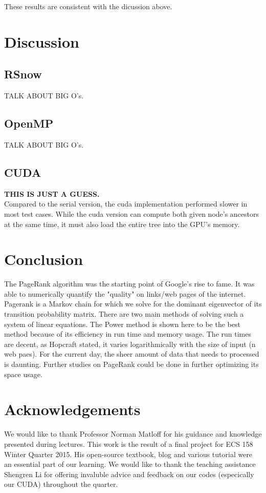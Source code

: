 \documentclass[11pt,letterpaper]{article}
\begin{document}
These results are consistent with the dicussion above. 

\section{Discussion}

\subsection{RSnow}
TALK ABOUT BIG O's.\\

\subsection{OpenMP}
TALK ABOUT BIG O's.\\

\subsection{CUDA}

\textbf{THIS IS JUST A GUESS.}\\ Compared to the serial version, the cuda implementation performed slower in most test cases. While the cuda version can compute both given node’s ancestors at the same time, it must also load the entire tree into the GPU’s memory.\\

\section{Conclusion}

The PageRank algorithm was the starting point of Google's rise to fame. It was able to numerically quantify the "quality" on links/web pages of the internet. Pagerank is a Markov chain for which we solve for the dominant eigenvector of its transition probability matrix. There are two main methods of solving such a system of linear equations. The Power method is shown here to be the best method because of its efficiency in run time and memory usage. The run times are decent, as Hopcraft stated, it varies logarithmically with the size of input (n web paes). For the current day, the sheer amount of data that needs to processed is daunting. Further studies on PageRank could be done in further optimizing its space usage. 

\section{Acknowledgements}
We would like to thank Professor Norman Matloff for his guidance and knowledge presented during lectures. This work is the result of a final project for ECS 158 Winter Quarter 2015.  His open-source textbook, blog and various tutorial were an essential part of our learning. We would like to thank the teaching assistance Shengren Li for offering invaluble advice and feedback on our codes (especically our CUDA) throughout the quarter.
\end{document}
